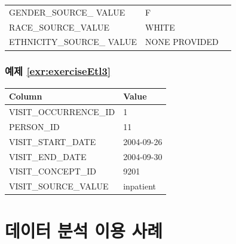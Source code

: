 \documentclass[10.5pt]{book}
\theoremstyle{definition}
\theoremstyle{definition}
\theoremstyle{definition}
\theoremstyle{remark}
\begin{document}
\begin{longtable}[]{@{}lll@{}}
\begin{minipage}[t]{0.23\columnwidth}
GENDER\_SOURCE\_ VALUE\strut
\end{minipage} & \begin{minipage}[t]{0.16\columnwidth}\raggedright\strut
F\strut
\end{minipage} & \begin{minipage}[t]{0.32\columnwidth}\raggedright\strut
\strut
\end{minipage}\tabularnewline
\begin{minipage}[t]{0.23\columnwidth}\raggedright\strut
RACE\_SOURCE\_VALUE\strut
\end{minipage} & \begin{minipage}[t]{0.16\columnwidth}\raggedright\strut
WHITE\strut
\end{minipage} & \begin{minipage}[t]{0.32\columnwidth}\raggedright\strut
\strut
\end{minipage}\tabularnewline
\begin{minipage}[t]{0.23\columnwidth}\raggedright\strut
ETHNICITY\_SOURCE\_ VALUE\strut
\end{minipage} & \begin{minipage}[t]{0.16\columnwidth}\raggedright\strut
NONE PROVIDED\strut
\end{minipage} & \begin{minipage}[t]{0.32\columnwidth}\raggedright\strut
\strut
\end{minipage}\tabularnewline
\bottomrule
\end{longtable}

\subsubsection*{예제 \ref{exr:exerciseEtl3}}\label{-refexrexerciseetl3}

\begin{longtable}[]{@{}ll@{}}
\toprule
Column & Value\tabularnewline
\midrule
\endhead
VISIT\_OCCURRENCE\_ID & 1\tabularnewline
PERSON\_ID & 11\tabularnewline
VISIT\_START\_DATE & 2004-09-26\tabularnewline
VISIT\_END\_DATE & 2004-09-30\tabularnewline
VISIT\_CONCEPT\_ID & 9201\tabularnewline
VISIT\_SOURCE\_VALUE & inpatient\tabularnewline
\bottomrule
\end{longtable}

\section{데이터 분석 이용 사례}\label{UseCasesanswers}
\end{document}
